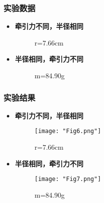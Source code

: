 \documentclass[12pt,hyperref,a4paper,UTF8]{ctexart}
\begin{document}
\subsubsection{实验数据}
    \begin{itemize}
        \item \textbf{牵引力不同，半径相同}
        \begin{figure}[!t]
            \centering
            \caption{r=7.66cm}
            \label{实验组1}
            \end{figure}
        \item \textbf{半径相同，牵引力不同}
        \begin{figure}[!t]
            \centering
            \caption{m=84.90g}
            \label{实验组2}
            \end{figure}
    \end{itemize}

\subsubsection{实验结果}
    \begin{itemize}
        \item \textbf{牵引力不同，半径相同}
        \begin{figure}[!t]
            \centering
                \texttt{[image: "Fig6.png"]}
            \caption{r=7.66cm}
            \label{实验组1}
            \end{figure}
        \item \textbf{半径相同，牵引力不同}
        \begin{figure}[!t]
            \centering
                \texttt{[image: "Fig7.png"]}
            \caption{m=84.90g}
            \label{实验组2}
            \end{figure}
    \end{itemize}
\end{document}
